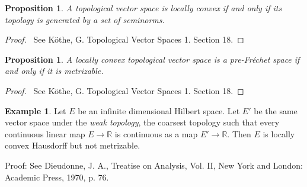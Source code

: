 \documentclass{book}
\let\qed\relax
\newtheorem{prop}[ax]{Proposition}
\theoremstyle{definition}
\newtheorem{ex}[ax]{Example}
\begin{document}
\begin{prop}
A topological vector space is locally convex if and only if its topology is generated by a set of seminorms.
\end{prop}

\begin{proof}
\pf\ See K\"{o}the, G. Topological Vector Spaces 1. Section 18. \qed
\end{proof}

\begin{prop}
A locally convex topological vector space is a pre-Fr\'{e}chet space if and only if it is metrizable.
\end{prop}

\begin{proof}
\pf\ See K\"{o}the, G. Topological Vector Spaces 1. Section 18. \qed
\end{proof}

\begin{ex}
Let $E$ be an infinite dimensional Hilbert space. Let $E'$ be the same vector space under the \emph{weak topology}, the coarsest topology such that every continuous linear map $E \rightarrow \mathbb{R}$ is continuous as a map $E' \rightarrow \mathbb{R}$. Then $E$ is locally convex Hausdorff but not metrizable.

Proof: See Dieudonne, J. A., Treatise on Analysis, Vol. II, New York and London: Academic Press, 1970, p. 76.
\end{ex}
\end{document}
